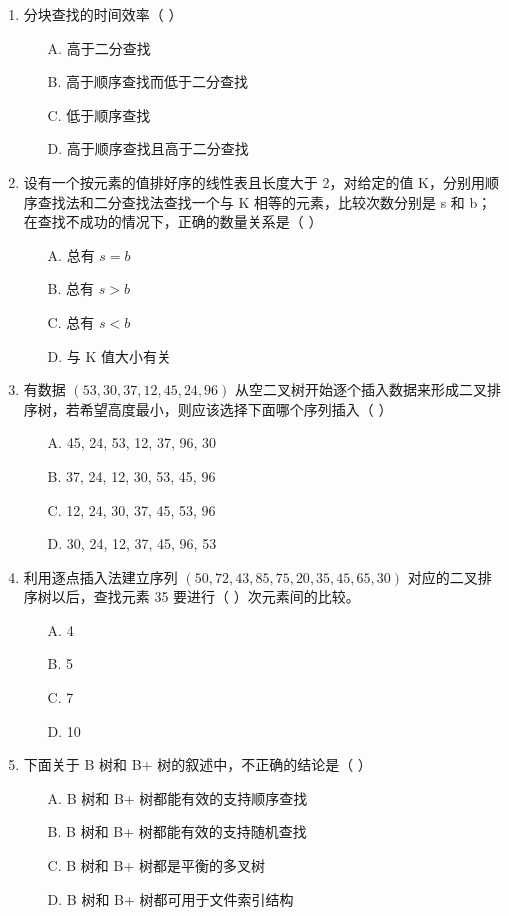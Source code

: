 \documentclass[12pt, a4paper]{article}
\begin{document}
\begin{enumerate}[label=\arabic*.]
	\item 分块查找的时间效率（ ）
	      \begin{enumerate}
		      \item[A.] 高于二分查找
		      \item[B.] 高于顺序查找而低于二分查找
		      \item[C.] 低于顺序查找
		      \item[D.] 高于顺序查找且高于二分查找
	      \end{enumerate}

	\item 设有一个按元素的值排好序的线性表且长度大于 2，对给定的值 K，分别用顺序查找法和二分查找法查找一个与 K 相等的元素，比较次数分别是 s 和 b；在查找不成功的情况下，正确的数量关系是（ ）
	      \begin{enumerate}
		      \item[A.] 总有 $s=b$
		      \item[B.] 总有 $s>b$
		      \item[C.] 总有 $s<b$
		      \item[D.] 与 K 值大小有关
	      \end{enumerate}

	\item 有数据 $(53, 30, 37, 12, 45, 24, 96)$ 从空二叉树开始逐个插入数据来形成二叉排序树，若希望高度最小，则应该选择下面哪个序列插入（ ）
	      \begin{enumerate}
		      \item[A.] 45, 24, 53, 12, 37, 96, 30
		      \item[B.] 37, 24, 12, 30, 53, 45, 96
		      \item[C.] 12, 24, 30, 37, 45, 53, 96
		      \item[D.] 30, 24, 12, 37, 45, 96, 53
	      \end{enumerate}

	\item 利用逐点插入法建立序列 $(50, 72, 43, 85, 75, 20, 35, 45, 65, 30)$ 对应的二叉排序树以后，查找元素 35 要进行（ ）次元素间的比较。
	      \begin{enumerate}
		      \item[A.] 4
		      \item[B.] 5
		      \item[C.] 7
		      \item[D.] 10
	      \end{enumerate}

	\item 下面关于 B 树和 B+ 树的叙述中，不正确的结论是（ ）
	      \begin{enumerate}
		      \item[A.] B 树和 B+ 树都能有效的支持顺序查找
		      \item[B.] B 树和 B+ 树都能有效的支持随机查找
		      \item[C.] B 树和 B+ 树都是平衡的多叉树
		      \item[D.] B 树和 B+ 树都可用于文件索引结构
	      \end{enumerate}


\end{enumerate}
\end{document}
